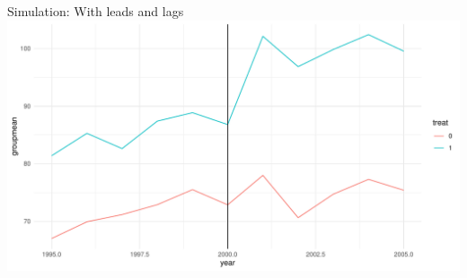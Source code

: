 \documentclass[
  ignorenonframetext,
]{beamer}
\begin{document}
\begin{frame}{Simulation: With leads and lags}
\protect\hypertarget{simulation-with-leads-and-lags-5}{}
\includegraphics{"Slides_DID_files/figure-beamer/didplot-1.pdf"}
\end{frame}
\end{document}
